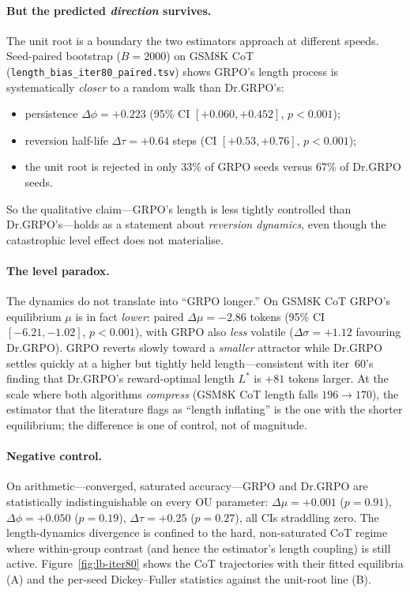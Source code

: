 \paragraph{But the predicted \emph{direction} survives.}
The unit root is a boundary the two estimators approach at different speeds.
Seed-paired bootstrap ($B=2000$) on GSM8K CoT
(\texttt{length\_bias\_iter80\_paired.tsv}) shows GRPO's length process is
systematically \emph{closer} to a random walk than Dr.GRPO's:
\begin{itemize}
\item persistence $\Delta\phi = +0.223$ (95\% CI $[+0.060,+0.452]$, $p<0.001$);
\item reversion half-life $\Delta\tau = +0.64$ steps (CI $[+0.53,+0.76]$, $p<0.001$);
\item the unit root is rejected in only $33\%$ of GRPO seeds versus $67\%$ of Dr.GRPO seeds.
\end{itemize}
So the qualitative claim---GRPO's length is less tightly controlled than
Dr.GRPO's---holds as a statement about \emph{reversion dynamics}, even
though the catastrophic level effect does not materialise.

\paragraph{The level paradox.}
The dynamics do not translate into ``GRPO longer.'' On GSM8K CoT GRPO's
equilibrium $\mu$ is in fact \emph{lower}: paired
$\Delta\mu = -2.86$ tokens (95\% CI $[-6.21,-1.02]$, $p<0.001$), with GRPO
also \emph{less} volatile ($\Delta\sigma=+1.12$ favouring Dr.GRPO). GRPO
reverts slowly toward a \emph{smaller} attractor while Dr.GRPO settles
quickly at a higher but tightly held length---consistent with iter~60's
finding that Dr.GRPO's reward-optimal length $L^\ast$ is $+81$ tokens larger.
At the scale where both algorithms \emph{compress} (GSM8K CoT length falls
$196\!\to\!170$), the estimator that the literature flags as ``length
inflating'' is the one with the shorter equilibrium; the difference is one
of control, not of magnitude.

\paragraph{Negative control.}
On arithmetic---converged, saturated accuracy---GRPO and Dr.GRPO are
statistically indistinguishable on every OU parameter: $\Delta\mu=+0.001$
($p=0.91$), $\Delta\phi=+0.050$ ($p=0.19$), $\Delta\tau=+0.25$ ($p=0.27$),
all CIs straddling zero. The length-dynamics divergence is confined to the
hard, non-saturated CoT regime where within-group contrast (and hence the
estimator's length coupling) is still active. Figure~\ref{fig:lb-iter80}
shows the CoT trajectories with their fitted equilibria (A) and the
per-seed Dickey--Fuller statistics against the unit-root line (B).

